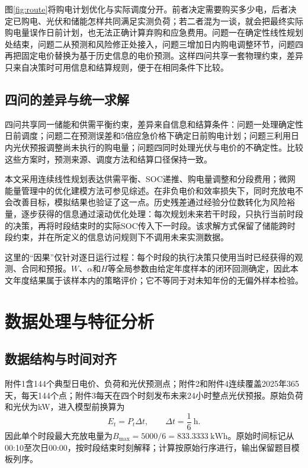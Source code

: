\documentclass[UTF8,12pt,a4paper]{ctexart}
\theoremstyle{remark}
\begin{document}
图\ref{fig:route}将购电计划优化与实际调度分开。前者决定需要购买多少电，后者决定已购电、光伏和储能怎样共同满足实测负荷；若二者混为一谈，就会把最终实际购电量误作日前计划，也无法正确计算弃购和应急费用。问题一在确定性线性规划处结束，问题二从预测和风险修正处接入，问题三增加日内购电调整环节，问题四再把固定电价替换为基于历史信息的电价预测。这样四问共享一套物理约束，差异只来自决策时可用信息和结算规则，便于在相同条件下比较。

\subsection{四问的差异与统一求解}
四问共享同一储能和供需平衡约束，差异来自信息和结算条件：问题一处理确定性日前调度；问题二在预测误差和5倍应急价格下确定日前购电计划；问题三利用日内光伏预报调整尚未执行的购电量；问题四同时处理光伏与电价的不确定性。比较这些方案时，预测来源、调度方法和结算口径保持一致。

本文采用连续线性规划表达供需平衡、SOC递推、购电量调整和分段费用；微网能量管理中的优化建模方法可参见综述\cite{nemati2018unitcommitment,thirunavukkarasu2022optimization}。在非负电价和效率损失下，同时充放电不会改善目标，模拟结果也验证了这一点。历史残差通过经验分位数转化为风险裕量，逐步获得的信息通过滚动优化处理：每次规划未来若干时段，只执行当前时段的决策，再将时段结束时的实际SOC传入下一时段。该求解方式保留了储能跨时段约束，并在所定义的信息访问规则下不调用未来实测数据。

这里的“因果”仅针对逐日运行过程：每个时段的执行决策只使用当时已经获得的观测、合同和预报。$W$、$\alpha$和$H$等全局参数由给定年度样本的闭环回测确定，因此本文年度结果属于该样本内的策略评价；它不等同于对未知年份的无偏外样本检验。

\section{数据处理与特征分析}
\subsection{数据结构与时间对齐}
附件1含144个典型日电价、负荷和光伏预测点；附件2和附件4连续覆盖2025年365天，每天144个点；附件3每天在四个时刻发布未来24小时整点光伏预报。原始负荷和光伏为kW，进入模型前换算为
\begin{equation}E_t=P_t\Delta t,\qquad \Delta t=\frac{1}{6}\ \mathrm{h}.\label{eq:power-energy}\end{equation}
因此单个时段最大充放电量为$B_{\max}=5000/6=833.3333\ \mathrm{kWh}$。原始时间标记从00:10至次日00:00，按时段结束时刻解释；计算按原始行序进行，输出保留题目模板列序。
\end{document}
